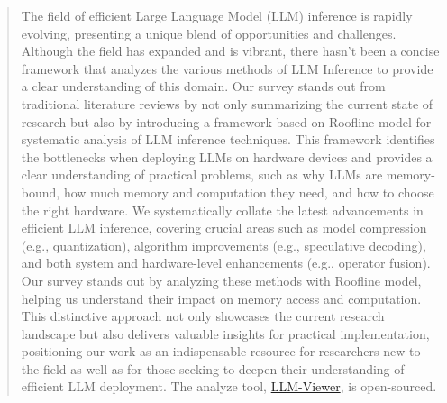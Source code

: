 \begin{abstract}
The field of efficient Large Language Model (LLM) inference is rapidly evolving, presenting a unique blend of opportunities and challenges. 
Although the field has expanded and is vibrant, there hasn't been a concise framework that analyzes the various methods of LLM Inference to provide a clear understanding of this domain.
Our survey stands out from traditional literature reviews by not only summarizing the current state of research but also by introducing a framework based on Roofline model for systematic analysis of LLM inference techniques. 
This framework identifies the bottlenecks when deploying LLMs on hardware devices and provides a clear understanding of practical problems, such as why LLMs are memory-bound, how much memory and computation they need, and how to choose the right hardware.
We systematically collate the latest advancements in efficient LLM inference, covering crucial areas such as model compression (e.g., quantization), algorithm improvements (e.g., speculative decoding), and both system and hardware-level enhancements (e.g., operator fusion). 
Our survey stands out by analyzing these methods with Roofline model, helping us understand their impact on memory access and computation.
This distinctive approach not only showcases the current research landscape but also delivers valuable insights for practical implementation, positioning our work as an indispensable resource for researchers new to the field as well as for those seeking to deepen their understanding of efficient LLM deployment. 
The analyze tool, \href{https://github.com/hahnyuan/LLM-Viewer}{LLM-Viewer}, is open-sourced.
\end{abstract}